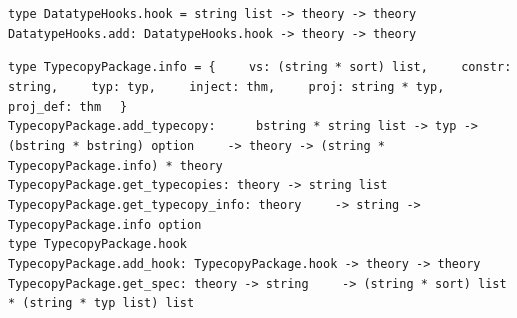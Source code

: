 \begin{isabellebody}
\begin{isamarkuptext}
\begin{description}
  \end{description}%
\end{isamarkuptext}%
\isamarkuptrue%
%
\endisatagmlref
{\isafoldmlref}%
%
\isadelimmlref
%
\endisadelimmlref
%
\isamarkuptrue%
%
\isadelimmlref
%
\endisadelimmlref
%
\isatagmlref
%
\begin{isamarkuptext}%
\begin{mldecls}
  \verb|type DatatypeHooks.hook = string list -> theory -> theory| \\
  \verb|DatatypeHooks.add: DatatypeHooks.hook -> theory -> theory|
  \end{mldecls}%
\end{isamarkuptext}%
\isamarkuptrue%
%
\begin{isamarkuptext}%
\begin{mldecls}
  \verb|type TypecopyPackage.info = {|\isasep\isanewline%
\verb|    vs: (string * sort) list,|\isasep\isanewline%
\verb|    constr: string,|\isasep\isanewline%
\verb|    typ: typ,|\isasep\isanewline%
\verb|    inject: thm,|\isasep\isanewline%
\verb|    proj: string * typ,|\isasep\isanewline%
\verb|    proj_def: thm|\isasep\isanewline%
\verb|  }| \\
  \verb|TypecopyPackage.add_typecopy: |\isasep\isanewline%
\verb|    bstring * string list -> typ -> (bstring * bstring) option|\isasep\isanewline%
\verb|    -> theory -> (string * TypecopyPackage.info) * theory| \\
  \verb|TypecopyPackage.get_typecopies: theory -> string list| \\
  \verb|TypecopyPackage.get_typecopy_info: theory|\isasep\isanewline%
\verb|    -> string -> TypecopyPackage.info option| \\
  \verb|type TypecopyPackage.hook| \\
  \verb|TypecopyPackage.add_hook: TypecopyPackage.hook -> theory -> theory| \\
  \verb|TypecopyPackage.get_spec: theory -> string|\isasep\isanewline%
\verb|    -> (string * sort) list * (string * typ list) list|
  \end{mldecls}%
\end{isamarkuptext}%
\isamarkuptrue%
%
\begin{isamarkuptext}%

\end{isamarkuptext}
\end{isabellebody}
